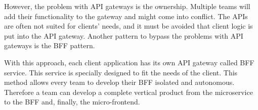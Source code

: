\bigskip

\noindent However, the problem with \ac{API} gateways is the ownership. Multiple teams will add their functionality to the gateway and might come into conflict. The \acp{API} are often not suited for clients' needs, and it must be avoided that client logic is put into the \ac{API} gateway. Another pattern to bypass the problems with \ac{API} gateways is the \ac{BFF} pattern. \cite[265-266]{book:2018:richardson:background:bff:microservices-patterns}

\bigskip

\noindent With this approach, each client application has its own \ac{API} gateway called \ac{BFF} service. This service is specially designed to fit the needs of the client. \cite[264-266]{book:2018:richardson:background:bff:microservices-patterns} \cite[71-72]{book:2021:newman:background:bff:micro-services} This method allows every team to develop their \ac{BFF} isolated and autonomous. Therefore a team can develop a complete vertical product from the microservice to the \ac{BFF} and, finally, the micro-frontend. \cite{book:2020:geers:background:micro-frontends:micro-frontends-in-action}
